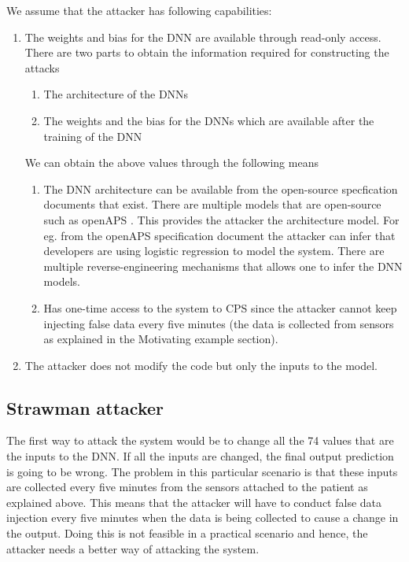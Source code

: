 We assume that the attacker has following capabilities:
\begin{enumerate}
	\item The weights and bias for the DNN are available through read-only access. There are two parts to obtain the information required for constructing the attacks
	\begin{enumerate}
		\item The architecture of the DNNs
		\item The weights and the bias for the DNNs which are available after the training of the DNN
	\end{enumerate}
We can obtain the above values through the following means
\begin{enumerate}
	\item The DNN architecture can be available from the open-source specfication documents that exist. There are multiple models that are open-source such as openAPS \cite{openAPS}. This provides the attacker the architecture model. For eg. from the openAPS specification document the attacker can infer that developers are using  logistic regression to model the system.  
	There are multiple reverse-engineering mechanisms \cite{10.1145/3195970.3196105} that allows one to infer the DNN models.  
	\item Has one-time access to the system to CPS since the attacker cannot keep injecting false data every five minutes (the data is collected from sensors as explained in the Motivating example section).
\end{enumerate}
  
	\item The attacker does not modify the code but only the inputs to the model.
\end{enumerate}

\subsection{Strawman attacker}
The first way to attack the system would be to change all the 74 values that are the inputs to the DNN. If all the inputs are changed, the final output prediction is going to be wrong. The problem in this particular scenario is that these inputs are collected every five minutes from the sensors attached to the patient as explained above. This means that the attacker will have to conduct false data injection every five minutes when the data is being collected to cause a change in the output. Doing this is not feasible in a practical scenario and hence, the attacker needs a better way of attacking the system. 

